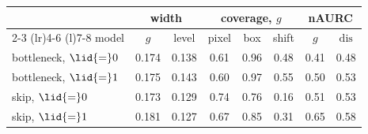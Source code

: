 \setlength{\tabcolsep}{3.5pt}
\begin{tabular}{@{}lccccccc@{}}
\toprule
& \multicolumn{2}{c}{width} & \multicolumn{3}{c}{coverage, $g$} & \multicolumn{2}{c}{nAURC} \\
\cmidrule(lr){2-3} \cmidrule(lr){4-6} \cmidrule(l){7-8}
model & $g$ & level & pixel & box & shift & $g$ & $\mathrm{dis}$ \\
\midrule
bottleneck, $\lid{=}0$ & 0.174 & 0.138 & 0.61 & 0.96 & 0.48 & 0.41 & 0.48 \\
bottleneck, $\lid{=}1$ & 0.175 & 0.143 & 0.60 & 0.97 & 0.55 & 0.50 & 0.53 \\
skip, $\lid{=}0$ & 0.173 & 0.129 & 0.74 & 0.76 & 0.16 & 0.51 & 0.53 \\
skip, $\lid{=}1$ & 0.181 & 0.127 & 0.67 & 0.85 & 0.31 & 0.65 & 0.58 \\
\bottomrule
\end{tabular}
